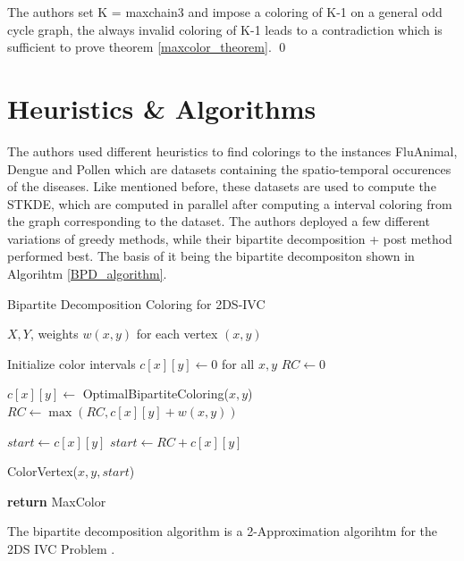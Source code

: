 \documentclass[sigconf]{acmart}
\begin{document}
The authors set K = maxchain3 and impose a coloring of K-1 on a general odd cycle graph, the always
invalid coloring of K-1 leads to a contradiction which is sufficient to prove theorem \ref{maxcolor_theorem}. \qed

\section{Heuristics \& Algorithms}
The authors used different heuristics to find colorings to the instances FluAnimal, Dengue and Pollen
which are datasets containing the spatio-temporal occurences of the diseases. Like mentioned before, 
these datasets are used to compute the STKDE, which are computed in parallel after computing a interval
coloring from the graph corresponding to the dataset. The authors deployed a few different variations of 
greedy methods, while their bipartite decomposition + post method performed best. The basis of 
it being the bipartite decompositon shown in Algorihtm \ref{BPD_algorithm}.

\begin{algorithm}[h]
  \caption{Bipartite Decomposition Coloring for 2DS-IVC \cite{main_paper}}
  \label{BPD_algorithm}
  \begin{algorithmic}[1]
  \Require $X, Y$, weights $w(x, y)$ for each vertex $(x, y)$
    
  \State Initialize color intervals $c[x][y] \gets 0$ for all $x, y$
  \State $RC \gets 0$ 
  
          \State $c[x][y] \gets$ OptimalBipartiteColoring($x, y$)
          \State $RC \gets \max(RC, c[x][y] + w(x, y))$
      \EndFor
  \EndFor
  
              \State $start \gets c[x][y]$ 
          \Else
              \State $start \gets RC + c[x][y]$ 
          \EndIf
          
          \State ColorVertex($x, y, start$)
      \EndFor
  \EndFor
  
  \State \textbf{return} MaxColor
  \end{algorithmic}
  \end{algorithm}

  \begin{theorem}
    The bipartite decomposition algorithm is a 2-Approximation algorihtm for the 2DS IVC Problem \cite{main_paper}.
  \end{theorem}
  
\end{document}
